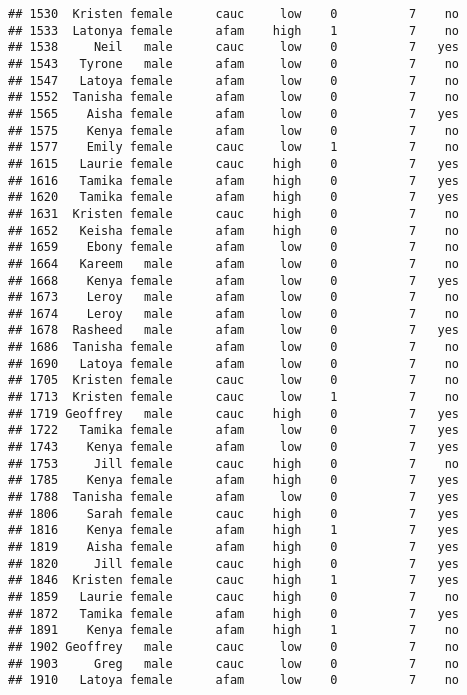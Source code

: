 \documentclass[
]{article}
\begin{document}
\begin{verbatim}
## 1530  Kristen female      cauc     low    0          7    no
## 1533  Latonya female      afam    high    1          7    no
## 1538     Neil   male      cauc     low    0          7   yes
## 1543   Tyrone   male      afam     low    0          7    no
## 1547   Latoya female      afam     low    0          7    no
## 1552  Tanisha female      afam     low    0          7    no
## 1565    Aisha female      afam     low    0          7   yes
## 1575    Kenya female      afam     low    0          7    no
## 1577    Emily female      cauc     low    1          7    no
## 1615   Laurie female      cauc    high    0          7   yes
## 1616   Tamika female      afam    high    0          7   yes
## 1620   Tamika female      afam    high    0          7   yes
## 1631  Kristen female      cauc    high    0          7    no
## 1652   Keisha female      afam    high    0          7    no
## 1659    Ebony female      afam     low    0          7    no
## 1664   Kareem   male      afam     low    0          7    no
## 1668    Kenya female      afam     low    0          7   yes
## 1673    Leroy   male      afam     low    0          7    no
## 1674    Leroy   male      afam     low    0          7    no
## 1678  Rasheed   male      afam     low    0          7   yes
## 1686  Tanisha female      afam     low    0          7    no
## 1690   Latoya female      afam     low    0          7    no
## 1705  Kristen female      cauc     low    0          7    no
## 1713  Kristen female      cauc     low    1          7    no
## 1719 Geoffrey   male      cauc    high    0          7   yes
## 1722   Tamika female      afam     low    0          7   yes
## 1743    Kenya female      afam     low    0          7   yes
## 1753     Jill female      cauc    high    0          7    no
## 1785    Kenya female      afam    high    0          7   yes
## 1788  Tanisha female      afam     low    0          7   yes
## 1806    Sarah female      cauc    high    0          7   yes
## 1816    Kenya female      afam    high    1          7   yes
## 1819    Aisha female      afam    high    0          7   yes
## 1820     Jill female      cauc    high    0          7   yes
## 1846  Kristen female      cauc    high    1          7   yes
## 1859   Laurie female      cauc    high    0          7    no
## 1872   Tamika female      afam    high    0          7   yes
## 1891    Kenya female      afam    high    1          7    no
## 1902 Geoffrey   male      cauc     low    0          7    no
## 1903     Greg   male      cauc     low    0          7    no
## 1910   Latoya female      afam     low    0          7    no

\end{verbatim}
\end{document}
